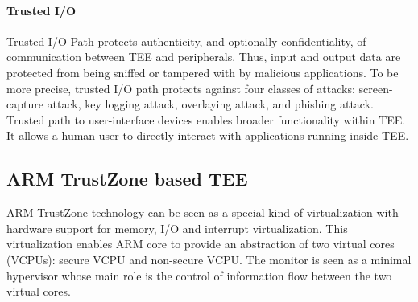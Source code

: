 \documentclass{article}
\begin{document}
\paragraph{Trusted I/O}

Trusted I/O Path protects authenticity, and optionally confidentiality, of communication between TEE and peripherals. Thus, input and output data are protected from being sniffed or tampered with by malicious applications. To be more precise, trusted I/O path protects against four classes of attacks: screen-capture attack, key logging attack, overlaying attack, and phishing attack. Trusted path to user-interface devices enables broader functionality within TEE. It allows a human user to directly interact with applications running inside TEE.

\subsection{ARM TrustZone based TEE}

ARM TrustZone technology can be seen as a special kind of virtualization with hardware support for memory, I/O and interrupt virtualization. This virtualization enables ARM core to provide an abstraction of two virtual cores (VCPUs): secure VCPU and non-secure VCPU. The monitor is seen as a minimal hypervisor whose main role is the control of information flow between the two virtual cores.
\end{document}
